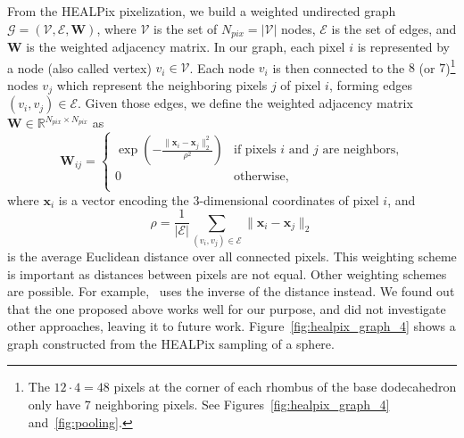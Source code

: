 \documentclass[final,twocolumn,3p,times,authoryear]{elsarticle}
\newcommand{\figref}[1]{Figure~\ref{fig:#1}}
\renewcommand{\b}[1]{{\bm{#1}}}   %
\newcommand{\1}{\b{1}}              %
\newcommand{\0}{\b{0}}              %
\newcommand{\G}{\mathcal{G}}
\newcommand{\V}{\mathcal{V}}
\newcommand{\E}{\mathcal{E}}
\newcommand{\W}{\b{W}}
\newcommand{\x}{\b{x}}
\newcommand{\R}{\mathbb{R}}
\begin{document}
From the HEALPix pixelization, we build a weighted undirected graph $\G = (\V, \E, \W)$, where $\V$ is the set of $N_{pix} = |\V|$ nodes, $\E$ is the set of edges, and $\W$ is the weighted adjacency matrix.
In our graph, each pixel $i$ is represented by a node (also called vertex) $v_i \in \V$.
Each node $v_i$ is then connected to the $8$ (or $7$)\footnote{\label{neighbors}The $12 \cdot 4 = 48$ pixels at the corner of each rhombus of the base dodecahedron only have 7 neighboring pixels. See Figures~\ref{fig:healpix_graph_4} and~\ref{fig:pooling}.} nodes $v_j$ which represent the neighboring pixels $j$ of pixel $i$, forming edges $(v_i, v_j) \in \E$. Given those edges, we define the weighted adjacency matrix $\W \in \R^{N_{pix} \times N_{pix}}$ as
\begin{equation*}
	\W_{ij} = \begin{cases}
		\exp \left( -\frac{\|\x_i-\x_j\|_2^2}{\rho^2} \right) & \text{if pixels $i$ and $j$ are neighbors,} \\
		0 & \text{otherwise,} \\
	\end{cases}
\end{equation*}
where $\x_i$ is a vector encoding the 3-dimensional coordinates of pixel $i$, and
\begin{equation*}
	\rho = \frac{1}{|\E|} \sum_{(v_i, v_j) \in \E} \|\x_i-\x_j\|_2
\end{equation*}
is the average Euclidean distance over all connected pixels. This weighting scheme is important as distances between pixels are not equal.
Other weighting schemes are possible. For example,~\cite{khasanova2017graphomni} uses the inverse of the distance instead. We found out that the one proposed above works well for our purpose, and did not investigate other approaches, leaving it to future work.
\figref{healpix_graph_4} shows a graph constructed from the HEALPix sampling of a sphere.

\end{document}
